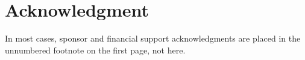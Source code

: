 \documentclass[journal,twoside,web]{ieeecolor}
\begin{document}


\section*{Acknowledgment}

In most cases, sponsor and financial support acknowledgments are placed in the unnumbered footnote on the first page, not here.



\end{document}
